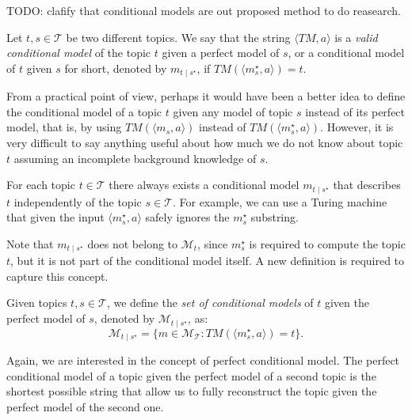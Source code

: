 {\color{red} TODO: clafify that conditional models are out proposed method to do reasearch.}

\begin{definition}
Let $t,s \in \mathcal{T}$ be two different topics. We say that the string $\langle TM,a \rangle$ is a \emph{valid conditional model} of the topic $t$ given a perfect model of $s$, or a conditional model of $t$ given $s$ for short, denoted by $m_{t \mid s^\star}$, if $TM \left(\langle m_s^\star, a \rangle \right) = t$.
\end{definition}

From a practical point of view, perhaps it would have been a better idea to define the conditional model of a topic $t$ given any model of topic $s$ instead of its perfect model, that is, by using $TM \left( \langle m_s, a \rangle \right)$ instead of $TM \left( \langle m_s^\star, a \rangle \right)$. However, it is very difficult to say anything useful about how much we do not know about topic $t$ assuming an incomplete background knowledge of $s$.

\begin{example}
For each topic $t \in \mathcal{T}$ there always exists a conditional model $m_{t \mid s^\star}$ that describes $t$ independently of the topic $s \in \mathcal{T}$. For example, we can use a Turing machine that given the input $\langle m_s^\star, a \rangle$ safely ignores the $m_s^\star$ substring.
\end{example}

Note that $m_{t \mid s^\star}$ does not belong to $\mathcal{M}_t$, since $m_s^\star$ is required to compute the topic $t$, but it is not part of the conditional model itself. A new definition is required to capture this concept.

\begin{definition}
Given topics $t,s \in \mathcal{T}$, we define the \emph{set of conditional models} of $t$ given the perfect model of $s$, denoted by $\mathcal{M}_{t \mid s^\star}$, as:
\[
\mathcal{M}_{t \mid s^\star} = \{ m \in \mathcal{M}_{\mathcal{T}} : TM \left(\langle m_s^\star, a \rangle \right) = t \}.
\]
\end{definition}

Again, we are interested in the concept of perfect conditional model. The perfect conditional model of a topic given the perfect model of a second topic is the shortest possible string that allow us to fully reconstruct the topic given the perfect model of the second one.

